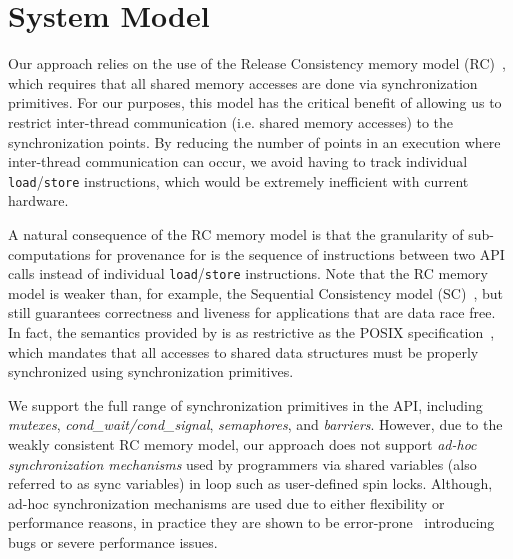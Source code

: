 \section{System Model}
\label{sec:model}

 Our approach relies on the use of the
Release Consistency memory model (RC)~\cite{DSM-RC}, which requires that all shared memory accesses are done via synchronization primitives.
For our purposes, this model has the critical
benefit of allowing us to restrict inter-thread communication (i.e. shared
memory accesses) to the synchronization points. By reducing the number of 
points in an execution where inter-thread communication can occur, we avoid
having to track individual {\tt load}/{\tt store} instructions, %
which would be extremely inefficient with current hardware. 

A natural consequence of the RC memory model is that the granularity of sub-computations for provenance for \projecttitle is the sequence of instructions between two \pthreads API calls instead of  individual {\tt load}/{\tt store} instructions. Note that the RC memory model is weaker
than, for example, the Sequential Consistency model (SC)~\cite{scLamport}, but
still guarantees correctness and liveness for applications that are data race
free. In fact,  the semantics provided by
\projecttitle is as restrictive as the POSIX specification~\cite{pthreads-spec}, which mandates that all accesses to shared data structures must be properly synchronized using 
\pthreads synchronization primitives. 

 We support the full range of synchronization
primitives in the \pthreads API, including {\em mutexes}, {\em cond\_wait/cond\_signal}, {\em semaphores},  and {\em
barriers}. However, due to the weakly consistent RC memory model, our approach
does not support {\em ad-hoc synchronization mechanisms} used by programmers via
shared variables (also referred to as sync variables) in loop such as user-defined spin locks. 
Although, ad-hoc synchronization mechanisms are used due to either flexibility
or performance reasons, in practice they are shown to be
error-prone~\cite{adhoc-sync} introducing bugs or severe performance issues.